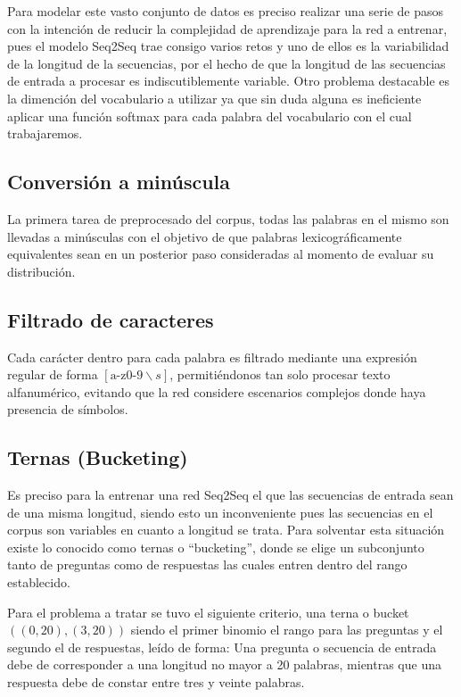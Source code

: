 \documentclass[12pt, letterpaper]{article}
\begin{document}
        Para modelar este vasto conjunto de datos es preciso realizar una serie de pasos con la intención de reducir la complejidad de aprendizaje para la red a entrenar, pues el modelo Seq2Seq trae consigo varios retos y uno de ellos es la variabilidad de la longitud de la secuencias, por el hecho de que la longitud de las secuencias de entrada a procesar es indiscutiblemente variable. Otro problema destacable es la dimención del vocabulario a utilizar ya que sin duda alguna es ineficiente aplicar una función softmax para cada palabra del vocabulario con el cual trabajaremos\cite{Ramamoorthy}.
        
        \subsection{Conversión a minúscula}
        La primera tarea de preprocesado del corpus, todas las palabras en el mismo son llevadas a minúsculas con el objetivo de que palabras lexicográficamente equivalentes sean en un posterior paso consideradas al momento de evaluar su distribución.
        
        \subsection{Filtrado de caracteres}
        Cada carácter dentro para cada palabra es filtrado mediante una expresión regular de forma $[\text{a-z0-9}\backslash{s}]$, permitiéndonos tan solo procesar texto alfanumérico, evitando que la red considere escenarios complejos donde haya presencia de símbolos.
        
        \subsection{Ternas (Bucketing)}
        Es preciso para la entrenar una red Seq2Seq el que las secuencias de entrada sean de una misma longitud, siendo esto un inconveniente pues las secuencias en el corpus son variables en cuanto a longitud se trata. Para solventar esta situación existe lo conocido como ternas o “bucketing”, donde se elige un subconjunto tanto de preguntas como de respuestas las cuales entren dentro del rango establecido.
        
        Para el problema a tratar se tuvo el siguiente criterio, una terna o bucket $((0,20),(3,20))$ siendo el primer binomio el rango para las preguntas y el segundo el de respuestas, leído de forma: Una pregunta o secuencia de entrada debe de corresponder a una longitud no mayor a 20 palabras, mientras que una respuesta debe de constar entre tres y veinte palabras.
        
\end{document}
